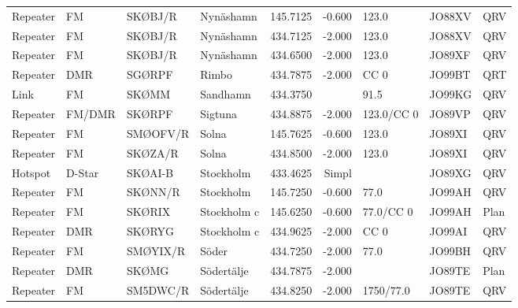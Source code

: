{\begin{landscape}
\begin{longtable}{llllrrlll}
	Repeater          & FM                 & SKØBJ/R  & Nynäshamn       &     145.7125 &     -0.600 & 123.0      & JO88XV      & QRV      \\
	Repeater          & FM                 & SKØBJ/R  & Nynäshamn       &     434.7125 &     -2.000 & 123.0      & JO88XV      & QRV      \\
	Repeater          & FM                 & SKØBJ/R  & Nynäshamn       &     434.6500 &     -2.000 & 123.0      & JO89XF      & QRV      \\
	Repeater          & DMR                & SGØRPF   & Rimbo           &     434.7875 &     -2.000 & CC 0       & JO99BT      & QRT      \\
	Link              & FM                 & SKØMM    & Sandhamn        &     434.3750 &            & 91.5       & JO99KG      & QRV      \\
	Repeater          & FM/DMR             & SKØRPF   & Sigtuna         &     434.8875 &     -2.000 & 123.0/CC 0 & JO89VP      & QRV      \\
	Repeater          & FM                 & SMØOFV/R & Solna           &     145.7625 &     -0.600 & 123.0      & JO89XI      & QRV      \\
	Repeater          & FM                 & SKØZA/R  & Solna           &     434.8500 &     -2.000 & 123.0      & JO89XI      & QRV      \\
	Hotspot           & D-Star             & SKØAI-B  & Stockholm       &     433.4625 &      Simpl &            & JO89XG      & QRV      \\
	Repeater          & FM                 & SKØNN/R  & Stockholm       &     145.7250 &     -0.600 & 77.0       & JO99AH      & QRV      \\
	Repeater          & FM                 & SKØRIX   & Stockholm c     &     145.6250 &     -0.600 & 77.0/CC 0  & JO99AH      & Plan     \\
	Repeater          & DMR                & SKØRYG   & Stockholm c     &     434.9625 &     -2.000 & CC 0       & JO99AI      & QRV      \\
	Repeater          & FM                 & SMØYIX/R & Söder           &     434.7250 &     -2.000 & 77.0       & JO99BH      & QRV      \\
	Repeater          & DMR                & SKØMG    & Södertälje      &     434.7875 &     -2.000 &            & JO89TE      & Plan     \\
	Repeater          & FM                 & SM5DWC/R & Södertälje      &     434.8250 &     -2.000 & 1750/77.0  & JO89TE      & QRV      \\

\end{longtable}
\end{landscape}}
